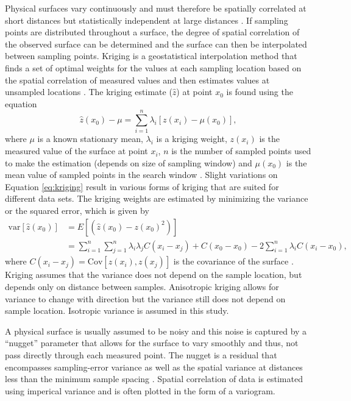 \documentclass{sfuthesis}
\begin{document}
Physical surfaces vary continuously and must therefore be spatially correlated at short distances but statistically independent at large distances \citep{Davis1986}. If sampling points are distributed throughout a surface, the degree of spatial correlation of the observed surface can be determined and the surface can then be interpolated between sampling points. Kriging is a geostatistical interpolation method that finds a set of optimal weights for the values at each sampling location based on the spatial correlation of measured values and then estimates values at unsampled locations \citep{Davis1986, Li2014}. The kriging estimate ($\hat{z}$) at point $x_0$ is found using the equation
\begin{equation}
\label{eq:kriging}
\hat{z}(x_0) - \mu = \sum_{i=1}^{n} \lambda_i [z(x_i)-\mu(x_0)],
\end{equation}
where $\mu$ is a known stationary mean, $\lambda_i$ is a kriging weight, $z(x_i)$ is the measured value of the surface at point $x_i$, $n$ is the number of sampled points used to make the estimation (depends on size of sampling window) and $\mu(x_0)$ is the mean value of sampled points in the search window \citep{Wackernagel2003, Li2008}. Slight variations on Equation \ref{eq:kriging} result in various forms of kriging that are suited for different data sets. The kriging weights are estimated by minimizing the variance or the squared error, which is given by
\begin{align}
\mathrm{var}[\hat{z}(x_0)] &= E[(\hat{z}(x_0)-z(x_0)^2)]\\
&=\sum_{i=1}^{n}\sum_{j=1}^{n}\lambda_i \lambda_j C(x_i-x_j)+C(x_0-x_0)-2 \sum_{i=1}^{n} \lambda_i C(x_i-x_0),
\end{align}
where $C(x_i-x_j) = \mathrm{Cov}[z(x_i),z(x_j)]$ is the covariance of the surface \citep{Li2008}. Kriging assumes that the variance does not depend on the sample location, but depends only on distance between samples.  Anisotropic kriging allows for variance to change with direction but the variance still does not depend on sample location. Isotropic variance is assumed in this study.

A physical surface is usually assumed to be noisy and this noise is captured by a ``nugget'' parameter that allows for the surface to vary smoothly and thus, not pass directly through each measured point. The nugget is a residual that encompasses sampling-error variance as well as the spatial variance at distances less than the minimum sample spacing \citep{Li2008}. Spatial correlation of data is estimated using imperical variance and is often plotted in the form of a variogram.  
\end{document}
